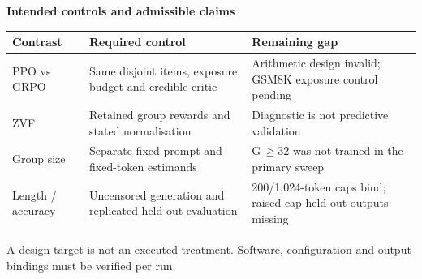 \documentclass[border=8pt]{standalone}
\begin{document}
\begin{minipage}{15.2cm}\sffamily\small
{\Large\bfseries\color{ink} Intended controls and admissible claims}\par\medskip
\renewcommand{\arraystretch}{1.4}
\begin{tabular}{@{}p{2.8cm}p{5.6cm}p{5.7cm}@{}}\toprule
Contrast & Required control & Remaining gap\\\midrule
PPO vs GRPO & Same disjoint items, exposure, budget and credible critic & Arithmetic design invalid; GSM8K exposure control pending\\
ZVF & Retained group rewards and stated normalisation & Diagnostic is not predictive validation\\
Group size & Separate fixed-prompt and fixed-token estimands & G\,$\ge32$ was not trained in the primary sweep\\
Length / accuracy & Uncensored generation and replicated held-out evaluation & 200/1,024-token caps bind; raised-cap held-out outputs missing\\\bottomrule
\end{tabular}\par\medskip
A design target is not an executed treatment. Software, configuration and output bindings must be verified per run.
\end{minipage}
\end{document}
